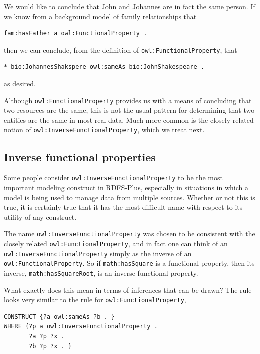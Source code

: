 We would like to conclude that John and Johannes are in fact the same
person. If we know from a background model of family relationships that

\begin{lstlisting}
fam:hasFather a owl:FunctionalProperty .
\end{lstlisting}

then we can conclude, from the definition of \texttt{owl:FunctionalProperty},
that

\begin{lstlisting}
* bio:JohannesShakspere owl:sameAs bio:JohnShakespeare .
\end{lstlisting}

as desired.

Although \texttt{owl:FunctionalProperty} provides us with a means of concluding
that two resources are the same, this is not the usual pattern for
determining that two entities are the same in most real data. Much more
common is the closely related notion of \texttt{owl:InverseFunctionalProperty},
which we treat next.

\subsection{Inverse functional properties}

Some people consider \texttt{owl:InverseFunctionalProperty} to be the most
important modeling construct in RDFS-Plus, especially in situations in
which a model is being used to manage data from multiple sources.
Whether or not this is true, it is certainly true that it has the most
difficult name with respect to its utility of any construct.

The name \texttt{owl:InverseFunctionalProperty} was chosen to be consistent with
the closely related \texttt{owl:FunctionalProperty}, and in fact one can think of
an \texttt{owl:InverseFunctionalProperty} simply as the inverse of an
\texttt{owl:FunctionalProperty}. So if \texttt{math:hasSquare} is a functional property,
then its inverse, \texttt{math:hasSquareRoot}, is an inverse functional
property.

What exactly does this mean in terms of inferences that can be drawn?
The rule looks very similar to the rule for \texttt{owl:FunctionalProperty},

\begin{lstlisting}
CONSTRUCT {?a owl:sameAs ?b . }
WHERE {?p a owl:InverseFunctionalProperty .
       ?a ?p ?x .
       ?b ?p ?x . }
\end{lstlisting}

